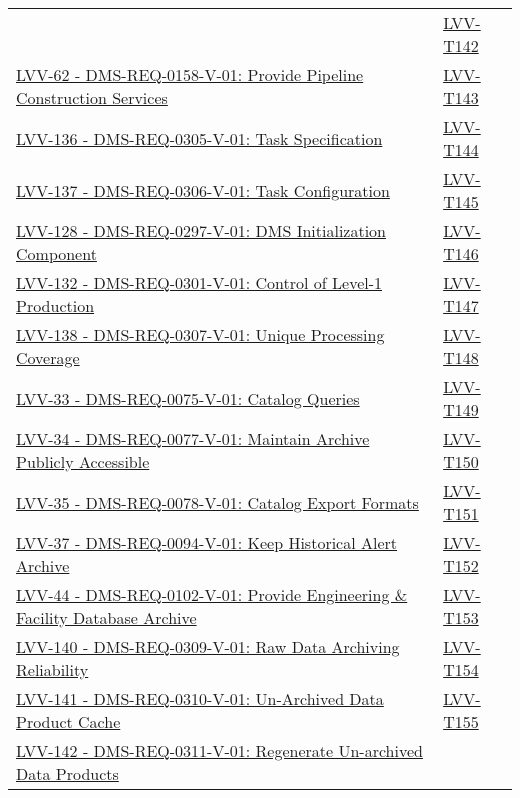 {\begin{longtable}[]{p{13cm}p{3cm}}
& {
\hyperref[lvv-t142]{LVV-T142}
} \\
\href{https://jira.lsstcorp.org/browse/LVV-62}{LVV-62 - DMS-REQ-0158-V-01: Provide Pipeline Construction Services}
& {
\hyperref[lvv-t143]{LVV-T143}
} \\
\href{https://jira.lsstcorp.org/browse/LVV-136}{LVV-136 - DMS-REQ-0305-V-01: Task Specification}
& {
\hyperref[lvv-t144]{LVV-T144}
} \\
\href{https://jira.lsstcorp.org/browse/LVV-137}{LVV-137 - DMS-REQ-0306-V-01: Task Configuration}
& {
\hyperref[lvv-t145]{LVV-T145}
} \\
\href{https://jira.lsstcorp.org/browse/LVV-128}{LVV-128 - DMS-REQ-0297-V-01: DMS Initialization Component}
& {
\hyperref[lvv-t146]{LVV-T146}
} \\
\href{https://jira.lsstcorp.org/browse/LVV-132}{LVV-132 - DMS-REQ-0301-V-01: Control of Level-1 Production}
& {
\hyperref[lvv-t147]{LVV-T147}
} \\
\href{https://jira.lsstcorp.org/browse/LVV-138}{LVV-138 - DMS-REQ-0307-V-01: Unique Processing Coverage}
& {
\hyperref[lvv-t148]{LVV-T148}
} \\
\href{https://jira.lsstcorp.org/browse/LVV-33}{LVV-33 - DMS-REQ-0075-V-01: Catalog Queries}
& {
\hyperref[lvv-t149]{LVV-T149}
} \\
\href{https://jira.lsstcorp.org/browse/LVV-34}{LVV-34 - DMS-REQ-0077-V-01: Maintain Archive Publicly Accessible}
& {
\hyperref[lvv-t150]{LVV-T150}
} \\
\href{https://jira.lsstcorp.org/browse/LVV-35}{LVV-35 - DMS-REQ-0078-V-01: Catalog Export Formats}
& {
\hyperref[lvv-t151]{LVV-T151}
} \\
\href{https://jira.lsstcorp.org/browse/LVV-37}{LVV-37 - DMS-REQ-0094-V-01: Keep Historical Alert Archive}
& {
\hyperref[lvv-t152]{LVV-T152}
} \\
\href{https://jira.lsstcorp.org/browse/LVV-44}{LVV-44 - DMS-REQ-0102-V-01: Provide Engineering \& Facility Database Archive}
& {
\hyperref[lvv-t153]{LVV-T153}
} \\
\href{https://jira.lsstcorp.org/browse/LVV-140}{LVV-140 - DMS-REQ-0309-V-01: Raw Data Archiving Reliability}
& {
\hyperref[lvv-t154]{LVV-T154}
} \\
\href{https://jira.lsstcorp.org/browse/LVV-141}{LVV-141 - DMS-REQ-0310-V-01: Un-Archived Data Product Cache}
& {
\hyperref[lvv-t155]{LVV-T155}
} \\
\href{https://jira.lsstcorp.org/browse/LVV-142}{LVV-142 - DMS-REQ-0311-V-01: Regenerate Un-archived Data Products}

\end{longtable}}
